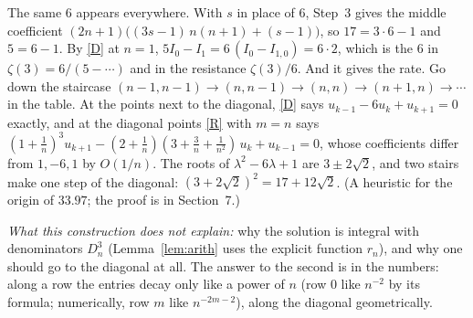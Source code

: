 \documentclass[11pt]{article}
\begin{document}
The same $6$ appears everywhere. With $s$ in place of $6$, Step~3 gives the middle coefficient
$(2n+1)\bigl((3s-1)\,n(n+1)+(s-1)\bigr)$, so $17=3\cdot6-1$ and $5=6-1$. By \eqref{D} at $n=1$,
$5I_0-I_1=6\,(I_0-I_{1,0})=6\cdot2$, which is the $6$ in $\zeta(3)=6/(5-\cdots)$ and in the resistance
$\zeta(3)/6$. And it gives the rate. Go down the staircase
$(n-1,n-1)\to(n,n-1)\to(n,n)\to(n+1,n)\to\cdots$ in the table. At the points next to the diagonal,
\eqref{D} says $u_{k-1}-6u_k+u_{k+1}=0$ exactly, and at the diagonal points \eqref{R} with $m=n$
says $(1+\frac1n)^3u_{k+1}-(2+\frac1n)(3+\frac3n+\frac1{n^2})\,u_k+u_{k-1}=0$, whose coefficients
differ from $1,-6,1$ by $O(1/n)$. The roots of $\lambda^2-6\lambda+1$ are $3\pm2\sqrt2$, and
two stairs make one step of the diagonal: $(3+2\sqrt2)^2=17+12\sqrt2$. (A heuristic for the origin
of $33.97$; the proof is in Section~7.)

\emph{What this construction does not explain:} why the solution is integral with denominators
$D_n^3$ (Lemma~\ref{lem:arith} uses the explicit function $r_n$), and why one should go to the
diagonal at all. The answer to the second is in the numbers: along a row the entries decay only
like a power of $n$ (row $0$ like $n^{-2}$ by its formula; numerically, row $m$ like $n^{-2m-2}$),
along the diagonal geometrically.
\end{document}
